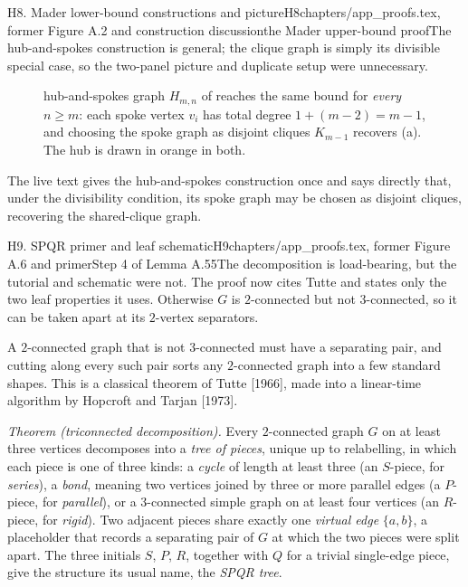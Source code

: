 \begin{offcutrewrite}{H8. Mader lower-bound constructions and picture}{H8}{chapters/app\_proofs.tex, former Figure A.2 and construction discussion}{the Mader upper-bound proof}{The hub-and-spokes construction is general; the clique graph is simply its divisible special case, so the two-panel picture and duplicate setup were unnecessary.}
\begin{figure}[htbp]
{hub-and-spokes graph $H_{m,n}$ of  reaches the same
bound for \emph{every} $n\ge m$: each spoke vertex $v_i$ has total degree
$1+(m-2)=m-1$, and choosing the spoke graph as disjoint cliques $K_{m-1}$
recovers (a). The hub is drawn in orange in both.}
\label{fig:mader-lower}
\end{figure}
\nowreads
The live text gives the hub-and-spokes construction once and says directly that, under the divisibility condition, its spoke graph may be chosen as disjoint cliques, recovering the shared-clique graph.
\end{offcutrewrite}

\begin{offcutrewrite}{H9. SPQR primer and leaf schematic}{H9}{chapters/app\_proofs.tex, former Figure A.6 and primer}{Step 4 of Lemma A.55}{The decomposition is load-bearing, but the tutorial and schematic were not. The proof now cites Tutte and states only the two leaf properties it uses.}
Otherwise $G$ is $2$-connected but not $3$-connected, so it can be taken
apart at its $2$-vertex separators.

\begin{primer}
A $2$-connected graph that is not $3$-connected must have a separating pair, and
cutting along every such pair sorts any $2$-connected graph into a few standard
shapes. This is a classical theorem of Tutte [1966], made into a
linear-time algorithm by Hopcroft and Tarjan [1973].

\emph{Theorem (triconnected decomposition).} Every $2$-connected graph $G$ on at
least three vertices decomposes into a \emph{tree of pieces}, unique up to
relabelling, in which each piece is one of three kinds: a \emph{cycle} of length
at least three (an $S$-piece, for \emph{series}), a \emph{bond}, meaning two
vertices joined by three or more parallel edges (a $P$-piece, for \emph{parallel}),
or a $3$-connected simple graph on at least four vertices (an $R$-piece, for
\emph{rigid}). Two adjacent pieces share exactly one \emph{virtual edge}
$\{a, b\}$, a placeholder that records a separating pair of $G$ at which the two
pieces were split apart. The three initials $S$, $P$, $R$, together with $Q$ for a
trivial single-edge piece, give the structure its usual name, the \emph{SPQR
tree}.


\end{primer}
\end{offcutrewrite}
